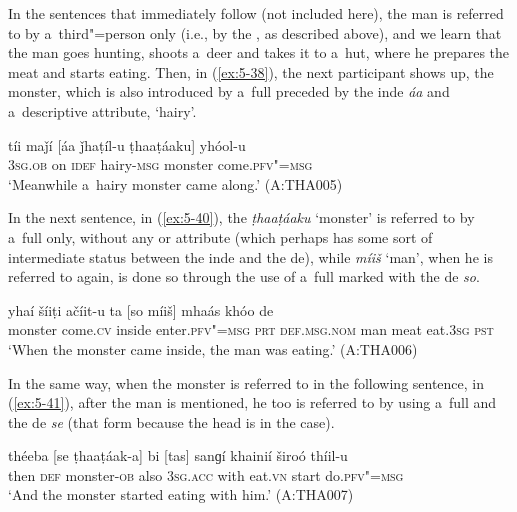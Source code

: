 In the sentences that immediately follow (not included here), the man is referred to by
a~third"=person  only (i.e., by the  , as described above), and we learn
that the man goes hunting, shoots a~deer and takes it to a~hut, where he prepares the meat and
starts eating. Then, in (\ref{ex:5-38}), the next participant shows up, the monster, which is also
introduced by a~full  preceded by the inde \textit{áa} and a~descriptive attribute,
`hairy'.
\begin{exe}
\ex
\label{ex:5-39}
\gll tíi maǰí [áa ǰhaṭíl-u ṭhaaṭáaku] yhóol-u\\
\textsc{3sg.ob} on \textsc{idef} hairy-\textsc{msg} monster come.\textsc{pfv"=msg}\\
\glt `Meanwhile a~hairy monster came along.' (A:THA005)
\end{exe}

In the next sentence, in (\ref{ex:5-40}), the \textit{ṭhaaṭáaku} `monster' is referred to by a~full 
only, without any  or attribute (which perhaps has some sort of intermediate status
between the inde and the de), while \textit{míiš} `man', when he is referred to
again, is done so through the use of a~full  marked with the de \textit{so}.
\begin{exe}
\ex
\label{ex:5-40}
\gll [ṭhaaṭáaku] yhaí šíiṭi ačíit-u ta [so míiš] mhaás khóo de\\
monster come.\textsc{cv} inside enter.\textsc{pfv"=msg} \textsc{prt} \textsc{def.msg.nom} man meat eat.\textsc{3sg} \textsc{pst}\\
\glt `When the monster came inside, the man was eating.' (A:THA006)
\end{exe}

In the same way, when the monster is referred to in the following sentence, in (\ref{ex:5-41}), after the man is mentioned, he too is referred to by using a~full  and the de \textit{se} (that form because the head is in the  case).
\begin{exe}
\ex
\label{ex:5-41}
\gll théeba [se ṭhaaṭáak-a] bi [tas] sanɡí khainií široó thíil-u\\
then \textsc{def} monster-\textsc{ob} also \textsc{3sg.acc} with eat.\textsc{vn} start do.\textsc{pfv"=msg}\\
\glt `And the monster started eating with him.' (A:THA007)
\end{exe}


